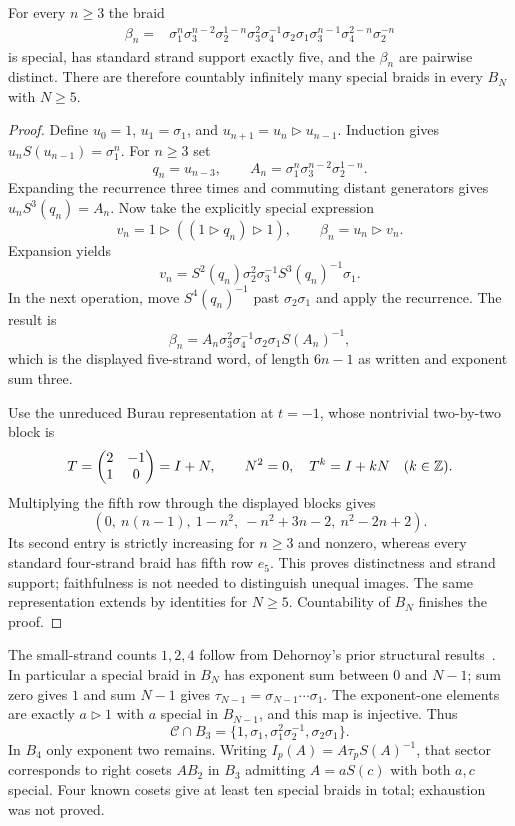 \begin{theorem}\label{prop:b9}
For every $n\ge3$ the braid
\begin{align*}
 \beta_n={}&\sigma_1^n\sigma_3^{n-2}\sigma_2^{1-n}
 \sigma_3^2\sigma_4^{-1}\sigma_2\sigma_1
 \sigma_3^{n-1}\sigma_4^{2-n}\sigma_2^{-n}
\end{align*}
is special, has standard strand support exactly five, and the
$\beta_n$ are pairwise distinct. There are therefore countably
infinitely many special braids in every $B_N$ with $N\ge5$.
\end{theorem}
\begin{proof}
Define $u_0=1$, $u_1=\sigma_1$, and
$u_{n+1}=u_n\triangleright u_{n-1}$. Induction gives
$u_nS(u_{n-1})=\sigma_1^n$. For $n\ge3$ set
\[
 q_n=u_{n-3},\qquad A_n=\sigma_1^n\sigma_3^{n-2}\sigma_2^{1-n}.
\]
Expanding the recurrence three times and commuting distant generators
gives $u_nS^3(q_n)=A_n$. Now take the explicitly special expression
\[
 v_n=1\triangleright((1\triangleright q_n)\triangleright1),
 \qquad \beta_n=u_n\triangleright v_n.
\]
Expansion yields
\[
 v_n=S^2(q_n)\sigma_2^2\sigma_3^{-1}S^3(q_n)^{-1}\sigma_1.
\]
In the next operation, move $S^4(q_n)^{-1}$ past $\sigma_2\sigma_1$
and apply the recurrence. The result is
\[
 \beta_n=A_n\sigma_3^2\sigma_4^{-1}\sigma_2\sigma_1S(A_n)^{-1},
\]
which is the displayed five-strand word, of length $6n-1$ as written
and exponent sum three.

Use the unreduced Burau representation at $t=-1$, whose nontrivial
two-by-two block is
\[
 T=\begin{pmatrix}2&-1\\1&0\end{pmatrix}=I+N,
 \qquad N^2=0,\quad T^k=I+kN\quad(k\in\mathbb Z).
\]
Multiplying the fifth row through the displayed blocks gives
\[
 (0,\ n(n-1),\ 1-n^2,\ -n^2+3n-2,\ n^2-2n+2).
\]
Its second entry is strictly increasing for $n\ge3$ and nonzero,
whereas every standard four-strand braid has fifth row $e_5$.
This proves distinctness and strand support; faithfulness is not
needed to distinguish unequal images. The same representation extends
by identities for $N\ge5$. Countability of $B_N$ finishes the proof.
\end{proof}

The small-strand counts $1,2,4$ follow from Dehornoy's prior structural
results~\cite[Sections 4--5]{dehornoy}. In particular a special braid
in $B_N$ has exponent sum between $0$ and $N-1$; sum zero gives $1$
and sum $N-1$ gives $\tau_{N-1}=\sigma_{N-1}\cdots\sigma_1$.
The exponent-one elements are exactly $a\triangleright1$ with
$a$ special in $B_{N-1}$, and this map is injective. Thus
\[
 \mathcal C\cap B_3=\{1,\sigma_1,\sigma_1^2\sigma_2^{-1},
 \sigma_2\sigma_1\}.
\]
In $B_4$ only exponent two remains. Writing
$I_p(A)=A\tau_p S(A)^{-1}$, that sector corresponds to right cosets
$AB_2$ in $B_3$ admitting $A=aS(c)$ with both $a,c$ special.
Four known cosets give at least ten special braids in total; exhaustion
was not proved.

